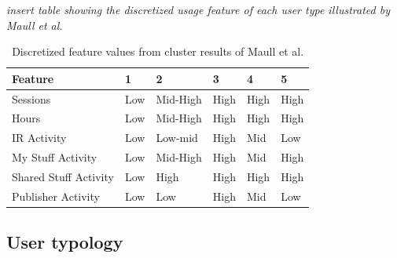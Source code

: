 \documentclass{acm_proc_article-sp}
\begin{document}
\textit{insert table showing the discretized usage feature of each user type illustrated by Maull et al.}

\begin{table}
\caption{Discretized feature values from cluster results of Maull et al. \cite{maullunderstanding}}
\label{maull_features}
\begin{tabular}{|l|l|l|l|l|l|} \\ \hline
Feature & 1 & 2 & 3 & 4 & 5 \\ \hline
Sessions & Low & Mid-High & High & High & High \\ \hline
Hours & Low & Mid-High & High & High & High \\ \hline
IR Activity & Low & Low-mid & High & Mid & Low \\ \hline
My Stuff Activity & Low & Mid-High & High & Mid & High \\ \hline
Shared Stuff Activity & Low & High & High & High & High \\ \hline
Publisher Activity & Low & Low & High & Mid & Low \\ \hline
\end{tabular}
\end{table}


\subsection{User typology}
\end{document}
